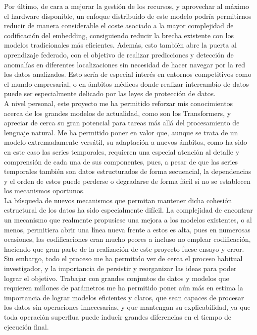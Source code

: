 Por último, de cara a mejorar la gestión de los recursos, y aprovechar al máximo el hardware disponible, un enfoque distribuido de este modelo podría permitirnos reducir de manera considerable el coste asociado a la mayor complejidad de codificación del embedding, consiguiendo reducir la brecha existente con los modelos tradicionales más eficientes. Además, esto también abre la puerta al aprendizaje federado, con el objetivo de realizar predicciones y detección de anomalías en diferentes localizaciones sin necesidad de hacer navegar por la red los datos analizados. Esto sería de especial interés en entornos competitivos como el mundo empresarial, o en ámbitos médicos donde realizar intercambio de datos puede ser especialmente delicado por las leyes de protección de datos.\\

A nivel personal, este proyecto me ha permitido reforzar mis conocimientos acerca de los grandes modelos de actualidad, como son los Transformers, y apreciar de cerca su gran potencial para tareas más allá del procesamiento de lenguaje natural. Me ha permitido poner en valor que, aunque se trata de un modelo extremadamente versátil, su adaptación a nuevos ámbitos, como ha sido en este caso las series temporales, requieren una especial atención al detalle y comprensión de cada una de sus componentes, pues, a pesar de que las series temporales también son datos estructurados de forma secuencial, la dependencias y el orden de estos puede perderse o degradarse de forma fácil si no se establecen los mecanismos oportunos.\\

La búsqueda de nuevos mecanismos que permitan mantener dicha cohesión estructural de los datos ha sido especialmente difícil. La complejidad de encontrar un mecanismo que realmente propusiese una mejora a los modelos existentes, o al menos, permitiera abrir una línea nueva frente a estos es alta, pues en numerosas ocasiones, las codificaciones eran mucho peores a incluso no emplear codificación, haciendo que gran parte de la realización de este proyecto fuese ensayo y error. Sin embargo, todo el proceso me ha permitido ver de cerca el proceso habitual investigador, y la importancia de persistir y reorganizar las ideas para poder lograr el objetivo. Trabajar con grandes conjuntos de datos y modelos que requieren millones de parámetros me ha permitido poner aún más en estima la importancia de lograr modelos eficientes y claros, que sean capaces de procesar los datos sin operaciones innecesarias, y que mantengan su explicabilidad, ya que toda operación superflua puede inducir grandes diferencias en el tiempo de ejecución final.